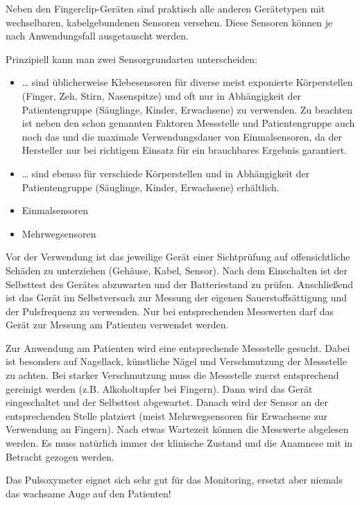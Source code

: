 {%
Neben den Fingerclip-Geräten sind praktisch alle anderen
Gerätetypen mit wechselbaren, kabelgebundenen Sensoren
versehen. Diese Sensoren können je nach Anwendungsfall
ausgetauscht werden.

Prinzipiell kann man zwei Sensorgrundarten unterscheiden:
\begin{itemize}
  \item {} \ldots{} sind üblicherweise
  Klebesensoren für diverse meist exponierte Körperstellen
  (Finger, Zeh, Stirn, Nasenspitze) und oft nur in
  Abhängigkeit der Patientengruppe (Säuglinge, Kinder,
  Erwachsene) zu verwenden. Zu beachten ist neben den schon
  genannten Faktoren Messstelle und Patientengruppe auch
  noch das  und die maximale Verwendungsdauer
  von Einmalsensoren, da der Hersteller nur bei richtigem
  Einsatz für ein brauchbares Ergebnis garantiert.
  \item {} \ldots{} sind ebenso für
  verschiede Körperstellen und in Abhängigkeit der
  Patientengruppe (Säuglinge, Kinder, Erwachsene)
  erhältlich.
\end{itemize}
}{
\begin{itemize}
  \item Einmalsensoren
  \item Mehrwegsensoren
\end{itemize}
}{}{}{}

{%
Vor der Verwendung ist das jeweilige Gerät einer
Sichtprüfung auf offensichtliche Schäden zu unterziehen
(Gehäuse, Kabel, Sensor). Nach dem Einschalten ist der
Selbsttest des Gerätes abzuwarten und der Batteriestand zu
prüfen. Anschließend ist das Gerät im Selbstversuch zur
Messung der eigenen Sauerstoffsättigung und der Pulsfrequenz
zu verwenden. Nur bei entsprechenden Messwerten darf das
Gerät zur Messung am Patienten verwendet werden.
}{}{}{}{}

{%
Zur Anwendung am Patienten wird eine entsprechende
Messstelle gesucht. Dabei ist besonders auf Nagellack,
künstliche Nägel und Verschmutzung der Messstelle zu achten.
Bei starker Verschmutzung muss die Messstelle zuerst
entsprechend gereinigt werden (z.B. Alkoholtupfer bei
Fingern). Dann wird das Gerät eingeschaltet und der
Selbsttest abgewartet. Danach wird der Sensor an der
entsprechenden Stelle platziert (meist Mehrwegsensoren für
Erwachsene zur Verwendung an Fingern).
Nach etwas Wartezeit können die Messwerte abgelesen werden.
Es muss natürlich immer der klinische Zustand und die
Anamnese mit in Betracht gezogen werden.



Das Pulsoxymeter eignet sich sehr gut für das Monitoring,
ersetzt aber niemals das wachsame Auge auf den Patienten!
}{}{}{}{}

